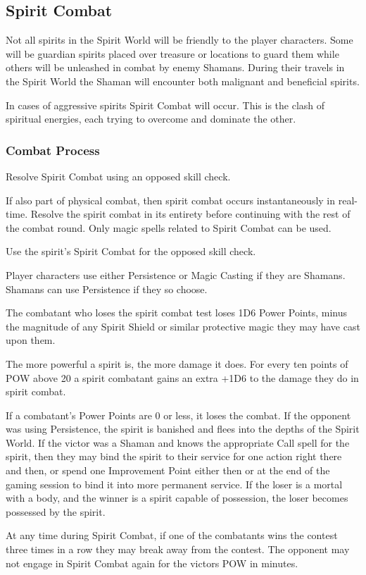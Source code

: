 

\subsection{Spirit Combat}
\label{ssec:spirit-combat}
Not all spirits in the Spirit World will be friendly to the player characters. Some will be guardian spirits placed over treasure or locations to guard them while others will be unleashed in combat by enemy Shamans. During their travels in the Spirit World the Shaman will encounter both malignant and beneficial spirits.

In cases of aggressive spirits Spirit Combat will occur. This is the clash of spiritual energies, each trying to overcome and dominate the other.

\subsubsection{Combat Process}
\begin{rpg-list}
\item Resolve Spirit Combat using an opposed skill check.
\item If also part of physical combat, then spirit combat occurs instantaneously in real-time. Resolve the spirit combat in its entirety before continuing with the rest of the combat round. Only magic spells related to Spirit Combat can be used.
\item Use the spirit's Spirit Combat for the opposed skill check.
\item Player characters use either Persistence or Magic Casting if they are Shamans. Shamans can use Persistence if they so choose.
\item The combatant who loses the spirit combat test loses 1D6 Power Points, minus the magnitude of any Spirit Shield or similar protective magic they may have cast upon them.
\item The more powerful a spirit is, the more damage it does. For every ten points of POW above 20 a spirit combatant gains an extra +1D6 to the damage they do in spirit combat.
\item If a combatant’s Power Points are 0 or less, it loses the combat. If the opponent was using Persistence, the spirit is banished and flees into the depths of the Spirit World. If the victor was a Shaman and knows the appropriate Call spell for the spirit, then they may bind the spirit to their service for one action right there and then, or spend one Improvement Point either then or at the end of the gaming session to bind it into more permanent service. If the loser is a mortal with a body, and the winner is a spirit capable of possession, the loser becomes possessed by the spirit.
\item At any time during Spirit Combat, if one of the combatants wins the contest three times in a row they may break away from the contest. The opponent may not engage in Spirit Combat again for the victors POW in minutes.
\end{rpg-list}


